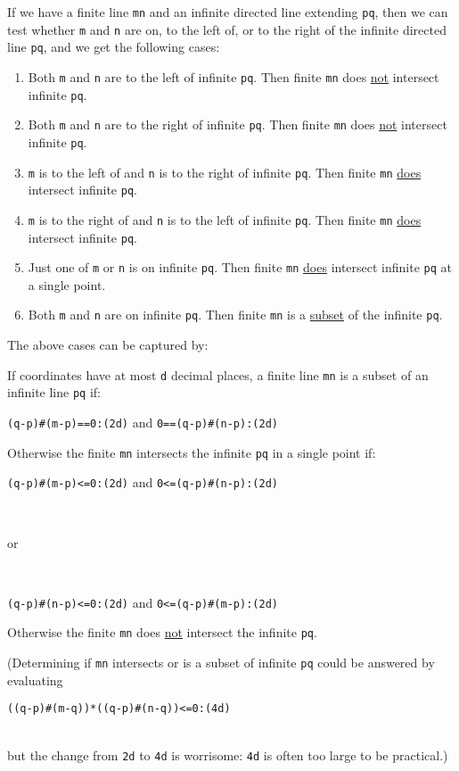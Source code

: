 \documentclass[12pt]{article}
\begin{document}
If we have a finite line {\tt mn} and an infinite directed line extending
{\tt pq}, then we can test whether {\tt m} and {\tt n} are on, to the left of,
or to the right of the infinite directed line {\tt pq}, and we get the
following cases:
\begin{enumerate}
\item Both {\tt m} and {\tt n} are to the left of infinite {\tt pq}.
Then finite {\tt mn} does \underline{not} intersect infinite {\tt pq}.
\item Both {\tt m} and {\tt n} are to the right of infinite {\tt pq}.
Then finite {\tt mn} does \underline{not} intersect infinite {\tt pq}.
\item {\tt m} is to the left of and {\tt n} is to the right of infinite {\tt pq}.
Then finite {\tt mn} \underline{does} intersect infinite {\tt pq}.
\item {\tt m} is to the right of and {\tt n} is to the left of
infinite {\tt pq}.
Then finite {\tt mn} \underline{does} intersect infinite {\tt pq}.
\item Just one of {\tt m} or {\tt n} is on infinite {\tt pq}.
Then finite {\tt mn} \underline{does} intersect infinite {\tt pq}
at a single point.
\item Both {\tt m} and {\tt n} are on infinite {\tt pq}.
Then finite {\tt mn} is a \underline{subset} of the infinite {\tt pq}.
\end{enumerate}

The above cases can be captured by:
\begin{lemma}
If coordinates have at most {\tt d} decimal places,
a finite line {\tt mn} is a subset of an infinite line {\tt pq} if:
\\[1ex]
\centerline{{\tt (q-p)\#(m-p)==0:(2d)} and {\tt 0==(q-p)\#(n-p):(2d)}}

Otherwise the finite {\tt mn} intersects the infinite {\tt pq}
in a single point if:
\\[1ex]
\centerline{{\tt (q-p)\#(m-p)<=0:(2d)} and {\tt 0<=(q-p)\#(n-p):(2d)}} \\
\centerline{or} \\
\centerline{{\tt (q-p)\#(n-p)<=0:(2d)} and {\tt 0<=(q-p)\#(m-p):(2d)}}

Otherwise the finite {\tt mn} does \underline{not} intersect
the infinite {\tt pq}.
\end{lemma}

(Determining if {\tt mn} intersects or is a subset of infinite {\tt pq}
could be answered by evaluating \\
\centerline{{\tt ((q-p)\#(m-q))*((q-p)\#(n-q))<=0:(4d)}} \\
but the change from {\tt 2d} to {\tt 4d} is worrisome: {\tt 4d}
is often too large to be practical.)
\end{document}
